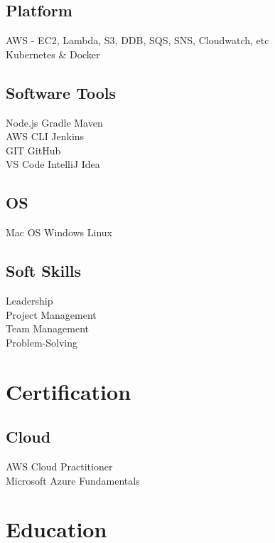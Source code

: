 \documentclass[]{main}
\begin{document}
\begin{minipage}[t]{0.25\textwidth}
\subsection{Platform}\sectionsep
\textbullet{}  AWS - EC2, Lambda, S3, DDB, SQS, SNS, Cloudwatch, etc\\
\textbullet{}  Kubernetes \& Docker
\sectionsep

\subsection{Software Tools}\sectionsep
\textbullet{} Node.js \textbullet{} Gradle \textbullet{} Maven\\
\textbullet{} AWS CLI \textbullet{} Jenkins\\
\textbullet{} GIT  \textbullet{} GitHub\\ 
\textbullet{} VS Code \textbullet{} IntelliJ Idea 
\sectionsep

\subsection{OS}\sectionsep
\textbullet{} Mac OS \textbullet{} Windows \textbullet{} Linux  
\sectionsep

\subsection{Soft Skills}\sectionsep
Leadership\\
Project Management\\
Team Management\\
Problem-Solving
\sectionsep

\section{Certification}
\subsection{Cloud}
\sectionsep
AWS Cloud Practitioner\\
Microsoft Azure Fundamentals\\

\section{Education} 

\end{minipage}
\end{document}
